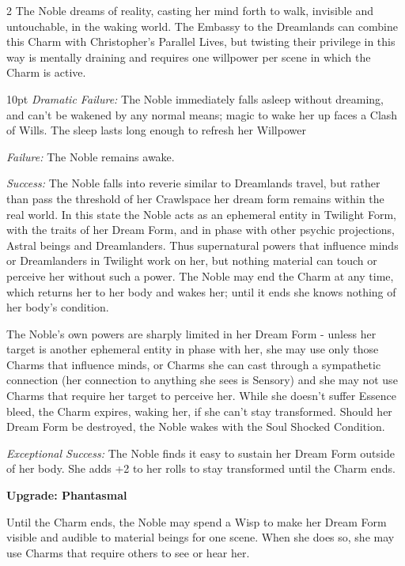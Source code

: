 \begin{multicols}{2}
\noindent The Noble dreams of reality, casting her mind forth to walk, invisible and untouchable, in the waking world. The Embassy to the Dreamlands can combine this Charm with Christopher's Parallel Lives, but twisting their privilege in this way is mentally draining and requires one willpower per scene in which the Charm is active.

\begin{myindentpar}{10pt} \emph{Dramatic Failure:} The Noble immediately falls asleep without dreaming, and can’t be wakened by any normal means; magic to wake her up faces a Clash of Wills. The sleep lasts long enough to refresh her Willpower

    \emph{Failure:} The Noble remains awake.

    \emph{Success:} The Noble falls into reverie similar to Dreamlands travel, but rather than pass the threshold of her Crawlspace her dream form remains within the real world. In this state the Noble acts as an ephemeral entity in Twilight Form, with the traits of her Dream Form, and in phase with other psychic projections, Astral beings and Dreamlanders. Thus supernatural powers that influence minds or Dreamlanders in Twilight work on her, but nothing material can touch or perceive her without such a power. The Noble may end the Charm at any time, which returns her to her body and wakes her; until it ends she knows nothing of her body’s condition.
	
	The Noble’s own powers are sharply limited in her Dream Form - unless her target is another ephemeral entity in phase with her, she may use only those Charms that influence minds, or Charms she can cast through a sympathetic connection (her connection to anything she sees is Sensory) and she may not use Charms that require her target to perceive her. While she doesn’t suffer Essence bleed, the Charm expires, waking her, if she can’t stay transformed. Should her Dream Form be destroyed, the Noble wakes with the Soul Shocked Condition.

    \emph{Exceptional Success:}  The Noble finds it easy to sustain her Dream Form outside of her body. She adds +2 to her rolls to stay transformed until the Charm ends.
	
	\textbf{Upgrade: Phantasmal}

    Until the Charm ends, the Noble may spend a Wisp to make her Dream Form visible and audible to material beings for one scene. When she does so, she may use Charms that require others to see or hear her.
	

\end{myindentpar}
\end{multicols}

